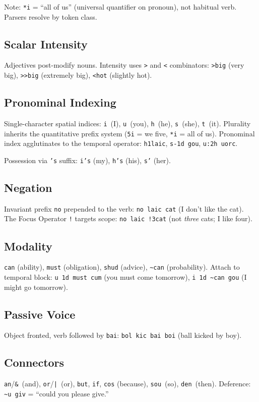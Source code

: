 \documentclass[10pt,onecolumn,letterpaper]{article}
\newcommand{\me}[1]{\texttt{#1}}
\begin{document}
Note: \me{*i} = ``all of us'' (universal quantifier on pronoun), not
habitual verb. Parsers resolve by token class.

\subsection{Scalar Intensity}
Adjectives post-modify nouns. Intensity uses \me{>} and \me{<} combinators:
\me{>big} (very big), \me{>>big} (extremely big), \me{<hot} (slightly hot).

\subsection{Pronominal Indexing}
Single-character spatial indices: \me{i}~(I), \me{u}~(you), \me{h}~(he),
\me{s}~(she), \me{t}~(it). Plurality inherits the quantitative prefix system
(\me{5i} = we five, \me{*i} = all of us). Pronominal index agglutinates to
the temporal operator: \me{h1laic}, \me{s-1d gou}, \me{u:2h uorc}.

Possession via \me{'s} suffix: \me{i's} (my), \me{h's} (his), \me{s'} (her).

\subsection{Negation}
Invariant prefix \me{no} prepended to the verb: \me{no laic cat} (I don't
like the cat). The Focus Operator \me{!} targets scope: \me{no laic !3cat}
(not \textit{three} cats; I like four).

\subsection{Modality}
\me{can} (ability), \me{must} (obligation), \me{shud} (advice),
\me{\~{}can} (probability). Attach to temporal block: \me{u 1d must cum}
(you must come tomorrow), \me{i 1d \~{}can gou} (I might go tomorrow).

\subsection{Passive Voice}
Object fronted, verb followed by \me{bai}: \me{bol kic bai boi} (ball
kicked by boy).

\subsection{Connectors}
\me{an}/\me{\&}~(and), \me{or}/\me{|}~(or), \me{but}, \me{if}, \me{cos}
(because), \me{sou}~(so), \me{den}~(then). Deference: \me{\~{}u giv}
= ``could you please give.''
\end{document}
